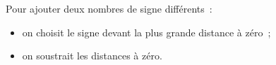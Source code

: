 Pour ajouter deux nombres de signe différents~:
\begin{itemize}[label=$-$]
    \item on choisit le signe devant la plus grande distance à zéro~;
    \item on soustrait les distances à zéro.
\end{itemize}